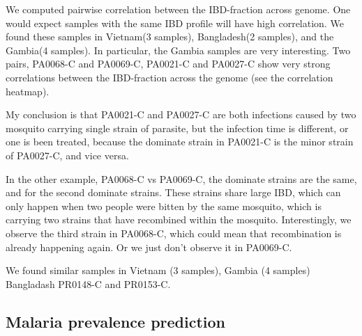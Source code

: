 \documentclass{article}
\begin{document}
We computed pairwise correlation between the IBD-fraction across genome. One would expect samples with the same IBD profile will have high correlation. We found these samples in Vietnam(3 samples), Bangladesh(2 samples), and the Gambia(4 samples). In particular, the Gambia samples are very interesting. Two pairs, PA0068-C and PA0069-C, PA0021-C and PA0027-C show very strong correlations between the IBD-fraction across the genome (see the correlation heatmap).







My conclusion is that PA0021-C and PA0027-C are both infections caused by two mosquito carrying single strain of parasite, but the infection time is different, or one is been treated, because the dominate strain in PA0021-C is the minor strain of PA0027-C, and vice versa.

In the other example,  PA0068-C vs PA0069-C, the dominate strains are the same, and for the second dominate strains. These strains share large IBD, which can only happen when two people were bitten by the same mosquito, which is carrying two strains that have recombined within the mosquito. Interestingly, we observe the third strain in PA0068-C, which could mean that recombination is already happening again. Or we just don't observe it in PA0069-C.

We found similar samples in Vietnam (3 samples), Gambia (4 samples) Bangladash PR0148-C and PR0153-C.




\subsection{Malaria prevalence prediction}
\end{document}
